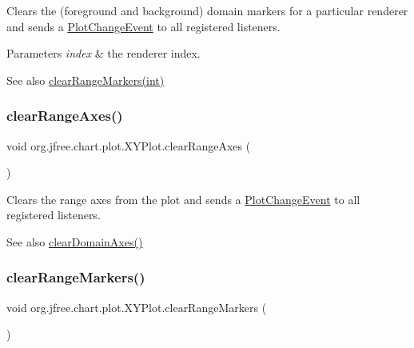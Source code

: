 Clears the (foreground and background) domain markers for a particular renderer and sends a \mbox{\hyperlink{}{Plot\+Change\+Event}} to all registered listeners.


\begin{DoxyParams}{Parameters}
{\em index} & the renderer index.\\
\hline
\end{DoxyParams}
\begin{DoxySeeAlso}{See also}
\mbox{\hyperlink{classorg_1_1jfree_1_1chart_1_1plot_1_1_x_y_plot_a7c45c1345592c8ec8e0082b268649a5c}{clear\+Range\+Markers(int)}} 
\end{DoxySeeAlso}
\mbox{\label{classorg_1_1jfree_1_1chart_1_1plot_1_1_x_y_plot_a5b2614cb3856efb052f6d4cf3b04ec13}} 
\subsubsection{\texorpdfstring{clear\+Range\+Axes()}{clearRangeAxes()}}
{\footnotesize\ttfamily void org.\+jfree.\+chart.\+plot.\+X\+Y\+Plot.\+clear\+Range\+Axes (\begin{DoxyParamCaption}{ }\end{DoxyParamCaption})}

Clears the range axes from the plot and sends a \mbox{\hyperlink{}{Plot\+Change\+Event}} to all registered listeners.

\begin{DoxySeeAlso}{See also}
\mbox{\hyperlink{classorg_1_1jfree_1_1chart_1_1plot_1_1_x_y_plot_a0c15e76e0e3466c41fe6537d2c356b15}{clear\+Domain\+Axes()}} 
\end{DoxySeeAlso}
\mbox{\label{classorg_1_1jfree_1_1chart_1_1plot_1_1_x_y_plot_a285a7793a2beb946d4beae4b02187f3c}} 
\subsubsection{\texorpdfstring{clear\+Range\+Markers()}{clearRangeMarkers()}\hspace{0.1cm}{\footnotesize\ttfamily [1/2]}}
{\footnotesize\ttfamily void org.\+jfree.\+chart.\+plot.\+X\+Y\+Plot.\+clear\+Range\+Markers (\begin{DoxyParamCaption}{ }\end{DoxyParamCaption})}

